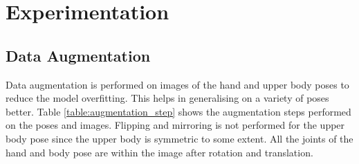 \section{Experimentation}
\subsection{Data Augmentation}
\noindent
Data augmentation is performed on images of the hand and upper body poses to reduce the model overfitting. This helps in generalising on a variety of poses better. Table \ref{table:augmentation_step} shows the augmentation steps performed on the poses and images. Flipping and mirroring is not performed for the upper body pose since the upper body is symmetric to some extent. All the joints of the hand and body pose are within the image after rotation and translation.


